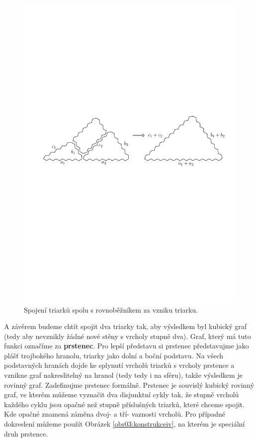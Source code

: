 \begin{figure}[h!]\centering
\includegraphics[width=\textwidth]{../img/T-T}
\caption{Spojení triarků spolu s rovnoběžníkem za vzniku triarku.}
\label{obr22:T-T}
\end{figure}

A závěrem budeme chtít spojit dva triarky tak, aby výsledkem byl kubický graf (tedy aby nevznikly žádné nové stěny s vrcholy stupně dva). Graf, který má tuto funkci označíme za \textbf{prstenec}. Pro lepší představu si prstenec představujme jako plášť trojbokého hranolu, triarky jako dolní a boční podstavu. Na všech podstavných hranách dojde ke splynutí vrcholů triarků s vrcholy prstence a vznikne graf nakreslitelný na hranol (tedy tedy i na sféru), takže výsledkem je rovinný graf. Zadefinujme prstenec formálně. Prstenec je souvislý kubický rovinný graf, ve kterém můžeme vyznačit dva disjunktní cykly tak, že stupně vrcholů každého cyklu jsou opačné než stupně příslušných triarků, které chceme spojit. Kde opačné znamená záměna dvoj- a tří- vaznosti vrcholů. Pro případné dokreslení můžeme použít Obrázek \ref{obr03:konstrukceiv}, na kterém je speciální druh prstence. 

